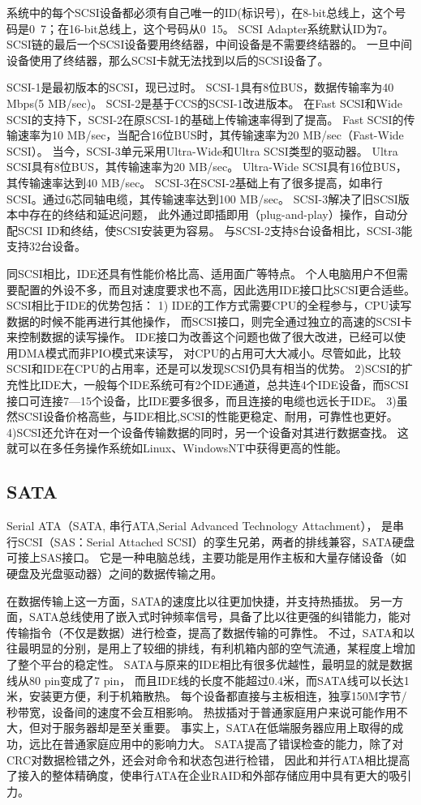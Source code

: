 系统中的每个SCSI设备都必须有自己唯一的ID(标识号)，在8-bit总线上，这个号码是0~7；在16-bit总线上，这个号码从0~15。
SCSI Adapter系统默认ID为7。
SCSI链的最后一个SCSI设备要用终结器，中间设备是不需要终结器的。
一旦中间设备使用了终结器，那么SCSI卡就无法找到以后的SCSI设备了。

SCSI-1是最初版本的SCSI，现已过时。
SCSI-1具有8位BUS，数据传输率为40 Mbps(5 MB/sec)。
SCSI-2是基于CCS的SCSI-1改进版本。
在Fast SCSI和Wide SCSI的支持下，SCSI-2在原SCSI-1的基础上传输速率得到了提高。
Fast SCSI的传输速率为10 MB/sec，当配合16位BUS时，其传输速率为20 MB/sec（Fast-Wide SCSI）。
当今，SCSI-3单元采用Ultra-Wide和Ultra SCSI类型的驱动器。
Ultra SCSI具有8位BUS，其传输速率为20 MB/sec。
Ultra-Wide SCSI具有16位BUS，其传输速率达到40 MB/sec。 
SCSI-3在SCSI-2基础上有了很多提高，如串行SCSI。通过6芯同轴电缆，其传输速率达到100 MB/sec。
SCSI-3解决了旧SCSI版本中存在的终结和延迟问题，
此外通过即插即用（plug-and-play）操作，自动分配SCSI ID和终结，使SCSI安装更为容易。
与SCSI-2支持8台设备相比，SCSI-3能支持32台设备。

同SCSI相比，IDE还具有性能价格比高、适用面广等特点。
个人电脑用户不但需要配置的外设不多，而且对速度要求也不高，因此选用IDE接口比SCSI更合适些。
SCSI相比于IDE的优势包括：
1)
IDE的工作方式需要CPU的全程参与，CPU读写数据的时候不能再进行其他操作，
而SCSI接口，则完全通过独立的高速的SCSI卡来控制数据的读写操作。
IDE接口为改善这个问题也做了很大改进，已经可以使用DMA模式而非PIO模式来读写，
对CPU的占用可大大减小。尽管如此，比较SCSI和IDE在CPU的占用率，还是可以发现SCSI仍具有相当的优势。
2)SCSI的扩充性比IDE大，一般每个IDE系统可有2个IDE通道，总共连4个IDE设备，而SCSI接口可连接7—15个设备，比IDE要多很多，而且连接的电缆也远长于IDE。
3)虽然SCSI设备价格高些，与IDE相比,SCSI的性能更稳定、耐用，可靠性也更好。
4)SCSI还允许在对一个设备传输数据的同时，另一个设备对其进行数据查找。
这就可以在多任务操作系统如Linux、WindowsNT中获得更高的性能。


\subsection{SATA}
Serial ATA（SATA, 串行ATA,Serial Advanced Technology Attachment），
是串行SCSI（SAS：Serial Attached SCSI）的孪生兄弟，两者的排线兼容，SATA硬盘可接上SAS接口。
它是一种电脑总线，主要功能是用作主板和大量存储设备（如硬盘及光盘驱动器）之间的数据传输之用。

在数据传输上这一方面，SATA的速度比以往更加快捷，并支持热插拔。
另一方面，SATA总线使用了嵌入式时钟频率信号，具备了比以往更强的纠错能力，能对传输指令（不仅是数据）进行检查，提高了数据传输的可靠性。
不过，SATA和以往最明显的分别，是用上了较细的排线，有利机箱内部的空气流通，某程度上增加了整个平台的稳定性。
SATA与原来的IDE相比有很多优越性，最明显的就是数据线从80 pin变成了7 pin，
而且IDE线的长度不能超过0.4米，而SATA线可以长达1米，安装更方便，利于机箱散热。
每个设备都直接与主板相连，独享150M字节/秒带宽，设备间的速度不会互相影响。
热拔插对于普通家庭用户来说可能作用不大，但对于服务器却是至关重要。
事实上，SATA在低端服务器应用上取得的成功，远比在普通家庭应用中的影响力大。
SATA提高了错误检查的能力，除了对CRC对数据检错之外，还会对命令和状态包进行检错，
因此和并行ATA相比提高了接入的整体精确度，使串行ATA在企业RAID和外部存储应用中具有更大的吸引力。 


